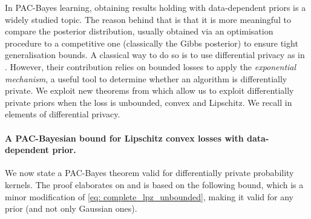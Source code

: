 In PAC-Bayes learning, obtaining results holding with data-dependent priors is a widely studied topic. The reason behind that is that it is more meaningful to compare the posterior distribution, usually obtained via an optimisation procedure to a competitive one (classically the Gibbs posterior) to ensure tight generalisation bounds.
A classical way to do so is to use differential privacy as in \citet{dziugaite2018data}. However, their contribution relies on bounded losses to apply the \emph{exponential mechanism}, a useful tool to determine whether an algorithm is differentially private. We exploit new theorems from \citet{minami2016diff,rogers2016max} which allow us to exploit differentially private priors when the loss is unbounded, convex and Lipschitz. We recall in  elements of differential privacy.

\paragraph{A PAC-Bayesian bound for Lipschitz convex losses with data-dependent prior.} We now state a PAC-Bayes theorem valid for differentially private probability kernels. The proof elaborates on \citet[Theorem 4.2]{dziugaite2018data} and is based on the following bound, which is a minor modification of \eqref{eq: complete_lpz_unbounded}, making it valid for any prior (and not only Gaussian ones).

